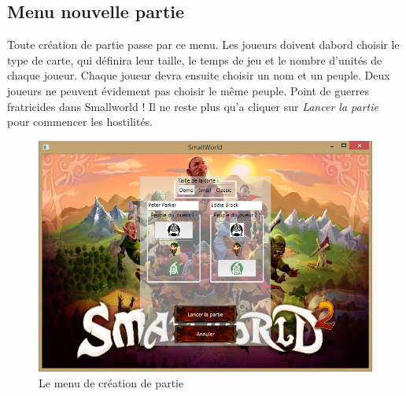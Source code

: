 	\subsection{Menu nouvelle partie}
		\label{subsec:nouvellpartie}
		Toute création de partie passe par ce menu. Les joueurs doivent dabord choisir le type de carte, qui définira leur taille, le temps de jeu et le nombre d'unités de chaque joueur.
		Chaque joueur devra ensuite choisir un nom et un peuple. Deux joueurs ne peuvent évidement pas choisir le même peuple. Point de guerres fratricides dans Smallworld !
		Il ne reste plus qu'a cliquer sur \textit{Lancer la partie} pour commencer les hostilités.
		\begin{figure}[h!]
			\caption{Le menu de création de partie}
			\label{fig:menuCreat}
			\centering
			\includegraphics[width=\textwidth]{res/new_game}
		\end{figure}
		

